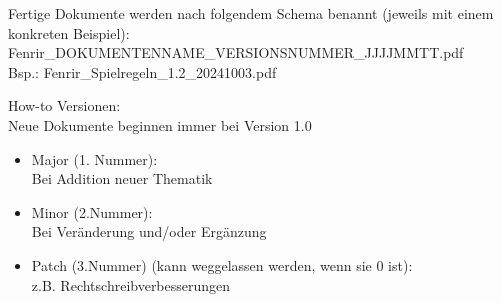 \documentclass[
	headings=optiontotocandhead,%
	oneside,
	numbers=noenddot,%
	toc=flat, %
	10pt, %
	parskip=full, %
	listof=totoc, %
	listof=flat, %
	numbers=noenddot, %
	bibliography=totoc, %
	a4paper,DIV=14,
]{scrartcl}
\begin{document}
Fertige Dokumente werden nach folgendem Schema benannt (jeweils mit einem konkreten Beispiel): \\
Fenrir\_DOKUMENTENNAME\_VERSIONSNUMMER\_JJJJMMTT.pdf \\
Bsp.: Fenrir\_Spielregeln\_1.2\_20241003.pdf

How-to Versionen:\\
Neue Dokumente beginnen immer bei Version 1.0
\begin{itemize}
\item{Major (1. Nummer):}\\
Bei Addition neuer Thematik

\item{Minor (2.Nummer):}\\
Bei Veränderung und/oder Ergänzung

\item{Patch (3.Nummer) (kann weggelassen werden, wenn sie 0 ist):}\\
z.B. Rechtschreibverbesserungen
\end{itemize}
\end{document}
